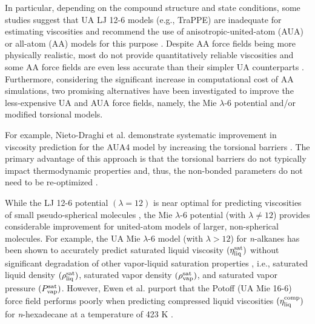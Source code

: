 \documentclass[preprint,review,12pt]{elsarticle}
\begin{document}
	In particular, depending on the compound structure and state conditions, some studies suggest that UA LJ 12-6 models (e.g., TraPPE) are inadequate for estimating viscosities and recommend the use of anisotropic-united-atom (AUA) or all-atom (AA) models for this purpose \cite{Allen1997,Payal2012,Mondello1997,Ungerer2007,Ewen2016}. Despite AA force fields being more physically realistic, most do not provide quantitatively reliable viscosities and some AA force fields are even less accurate than their simpler UA counterparts \cite{Allen1997,Ewen2016}. Furthermore, considering the significant increase in computational cost of AA simulations, two promising alternatives have been investigated to improve the less-expensive UA and AUA force fields, namely, the Mie $\lambda$-6 potential and/or modified torsional models.
	
	
	For example, Nieto-Draghi et al. demonstrate systematic improvement in viscosity prediction for the AUA4 model by increasing the torsional barriers \cite{Nieto2006,Nieto2008}. The primary advantage of this approach is that the torsional barriers do not typically impact thermodynamic properties and, thus, the non-bonded parameters do not need to be re-optimized \cite{Intra_Potoff}. 
	
	While the LJ 12-6 potential $(\lambda = 12)$ is near optimal for predicting viscosities of small pseudo-spherical molecules \cite{Galliero2005,Galliero2005b,Galliero2008}, the Mie $\lambda$-6 potential (with $\lambda \ne 12$) provides considerable improvement for united-atom models of larger, non-spherical molecules. For example, the UA Mie $\lambda$-6 model (with $\lambda > 12$) for \textit{n}-alkanes has been shown to accurately predict saturated liquid viscosity $(\eta_{\rm liq}^{\rm sat})$ without significant degradation of other vapor-liquid saturation properties \cite{Gordon2006}, i.e., saturated liquid density $(\rho_{\rm liq}^{\rm sat})$, saturated vapor density $(\rho_{\rm vap}^{\rm sat})$, and saturated vapor pressure $(P_{\rm vap}^{\rm sat})$. However, Ewen et al. purport that the Potoff (UA Mie 16-6) force field performs poorly when predicting compressed liquid viscosities $(\eta_{\rm liq}^{\rm comp})$ for \textit{n}-hexadecane at a temperature of 423 K \cite{Ewen2016}.
	
	
\end{document}
